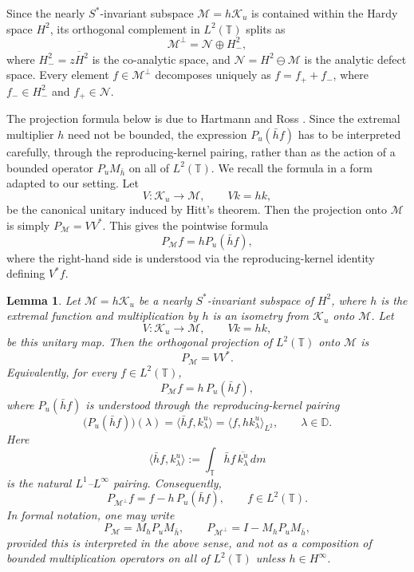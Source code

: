 \documentclass[12pt]{amsart}
\newtheorem{lemma}[theorem]{Lemma}
\theoremstyle{definition}
\theoremstyle{remark}
\def \D{\mathbb{D}}
\def \T{\mathbb{T}}
\newcommand{\clm}{\mathcal{M}}
\newcommand{\cln}{\mathcal{N}}
\newcommand{\clk}{\mathcal{K}}
\newcommand{\ol}{\overline}
\numberwithin{equation}{section}
\begin{document}
Since the nearly $S^*$-invariant subspace $\clm = h\clk_u$ is contained within the Hardy space $H^2$, its orthogonal complement in $L^2(\T)$ splits as
\[ \clm^\perp = \cln \oplus H_{-}^2, \]
where $H_{-}^2 = \ol{zH^2}$ is the co-analytic space, and $\cln = H^2 \ominus \clm$ is the analytic defect space. Every element $f \in \clm^\perp$ decomposes uniquely as $f = f_{+} + f_{-}$, where $f_{-} \in H^2_{-}$ and $f_{+} \in \cln$.

The projection formula below is due to Hartmann and Ross
\cite[Lemma~2.4]{Hartmann:Ross}. Since the extremal multiplier $h$ need not be bounded, the expression $P_u(\bar h f)$ has to be interpreted carefully, through the reproducing-kernel pairing, rather than as the action of a bounded operator $P_uM_{\bar h}$ on all of $L^2(\T)$. We recall the formula in a form adapted to our setting. Let
\[
V:\clk_u\to \clm,\qquad Vk=hk,
\]
be the canonical unitary induced by Hitt's theorem. Then the projection onto $\clm$ is simply $P_\clm=VV^*$. This gives the pointwise formula
\[
P_\clm f=hP_u(\bar h f),
\]
where the right-hand side is understood via the reproducing-kernel identity defining $V^*f$.

\begin{lemma}\label{lem:proj}
Let $\clm=h\clk_u$ be a nearly $S^*$-invariant subspace of $H^2$, where $h$ is the extremal function and multiplication by $h$ is an isometry from $\clk_u$ onto $\clm$. Let
\[
V:\clk_u\to \clm,\qquad Vk=hk ,
\]
be this unitary map. Then the orthogonal projection of $L^2(\T)$ onto $\clm$ is
\[
P_\clm=VV^*.
\]
Equivalently, for every $f\in L^2(\T)$,
\[
P_\clm f=h\,P_u(\bar h f),
\]
where $P_u(\bar h f)$ is understood through the reproducing-kernel pairing
\[
\big(P_u(\bar h f)\big)(\lambda)
=
\langle \bar h f,k_\lambda^u\rangle
=
\langle f,hk_\lambda^u\rangle_{L^2},
\qquad \lambda\in\D.
\]
Here
\[
\langle \bar h f,k_\lambda^u\rangle
:=
\int_\T \bar h f\,\overline{k_\lambda^u}\,dm
\]
is the natural $L^1$--$L^\infty$ pairing. Consequently,
\[
P_{\clm^\perp}f=f-h\,P_u(\bar h f), \qquad f\in L^2(\T).
\]
In formal notation, one may write
\[
P_\clm=M_hP_uM_{\bar h}, \qquad  P_{\clm^\perp}=I-M_hP_uM_{\bar h},
\]
provided this is interpreted in the above sense, and not as a composition of bounded multiplication operators on all of $L^2(\T)$ unless $h\in H^\infty$.
\end{lemma}
\end{document}

